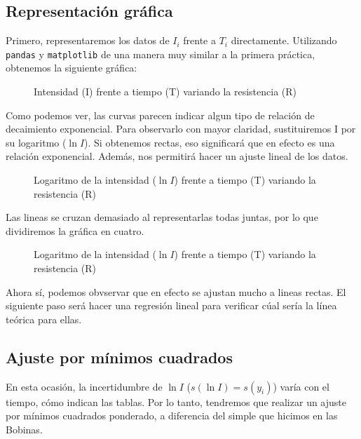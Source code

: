 \documentclass[12pt, a4paper, titlepage]{article}
\newcommand{\code}[1]{\texttt{#1}} %
\begin{document}
  \newpage
  \subsection{Representación gráfica}

  Primero, representaremos los datos de $I_i$ frente a $T_i$ directamente. Utilizando \code{pandas} y \code{matplotlib} de una manera muy similar a la primera práctica, obtenemos la siguiente gráfica:

  \begin{figure}[H]
    \hspace{3em} 
    \caption{Intensidad (I) frente a tiempo (T) variando la resistencia (R)}
  \end{figure}

  Como podemos ver, las curvas parecen indicar algun tipo de relación de decaimiento exponencial. Para observarlo con mayor claridad, sustituiremos I por su logaritmo ($\ln{I}$). Si obtenemos rectas, eso significará que en efecto es una relación exponencial. Además, nos permitirá hacer un ajuste lineal de los datos.

  \begin{figure}[H]
    \hspace{1.8em} 
    \caption{Logaritmo de la intensidad ($\ln{I}$) frente a tiempo (T) variando la resistencia (R)}
  \end{figure}

  Las lineas se cruzan demasiado al representarlas todas juntas, por lo que dividiremos la gráfica en cuatro.

  \begin{figure}[H]
    \hspace{0.2em} 
    \caption{Logaritmo de la intensidad ($\ln{I}$) frente a tiempo (T) variando la resistencia (R)}
  \end{figure}

  Ahora sí, podemos obvservar que en efecto se ajustan mucho a lineas rectas. El siguiente paso será hacer una regresión lineal para verificar cúal sería la línea teórica para ellas.

  \newpage
  \subsection{Ajuste por mínimos cuadrados}

  En esta ocasión, la incertidumbre de $\ln{I}$ ($s(\ln{I}) = s(y_i)$) varía con el tiempo, cómo indican las tablas. Por lo tanto, tendremos que realizar un ajuste por mínimos cuadrados ponderado, a diferencia del simple que hicimos en las Bobinas.
\end{document}
